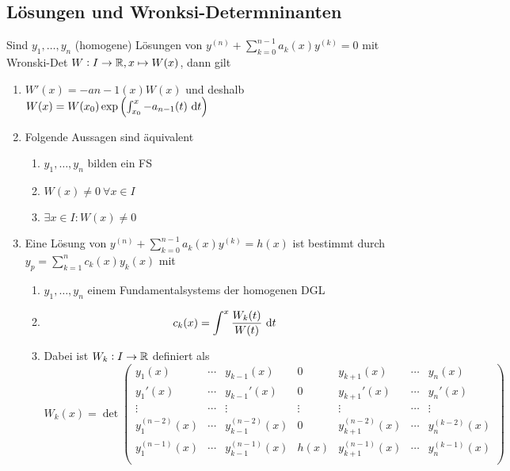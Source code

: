 \subsection{Lösungen und Wronksi-Determninanten}
Sind $y_1, \ldots, y_n$ (homogene) Lösungen von $y^{(n)} + \sum_{k=0}^{n-1} a_k(x) y^{(k)} = 0$ mit Wronski-Det $W: I \to \mathbb{R}, x\mapsto W(x)$,
dann gilt
\begin{enumerate}[label= (\alph*)]
	\item $W'(x) = -a{n-1}(x) W(x)$ und deshalb
		$W(x) = W(x_0) \exp \left( \int_{x_0}^x -a_{n-1}(t) \text{ d}t \right)$
	\item Folgende Aussagen sind äquivalent
		\begin{enumerate}
			\item $y_1, \ldots, y_n$ bilden ein FS
			\item $W(x) \neq 0\ \forall x \in I$
			\item $\exists x  \in I: W(x)  \neq 0$ 
		\end{enumerate}
	\item Eine Lösung von $y^{(n)} + \sum_{k=0}^{n-1} a_k(x) y^{(k)} = h(x)$ ist bestimmt durch
		$y_p = \sum_{k=1}^n c_k(x) y_k(x)$ mit
		\begin{enumerate}
			\item $y_1, \ldots, y_n$ einem Fundamentalsystems der homogenen DGL
			\item
				\begin{equation*}
					c_k(x) = \int^x  \frac{W_k(t)}{W(t)} \text{ d}t
				\end{equation*} 
			\item Dabei ist $W_k: I \to \mathbb{R}$ definiert als
				\begin{equation*}
					W_k(x) = \det \begin{pmatrix}
						y_1(x) & \cdots & y_{k-1}(x) & 0 & y_{k+1}(x) & \cdots & y_n(x) \\
						y_1'(x) & \cdots & y_{k-1}'(x) & 0 & y_{k+1}'(x) & \cdots & y_n'(x) \\
						\vdots & \cdots & \vdots & \vdots & \vdots & \cdots & \vdots \\
						y_1^{(n-2)}(x) & \cdots & y_{k-1}^{(n-2)}(x) & 0 & y_{k+1}^{(n-2)}(x) & \cdots & y_n^{(k-2)}(x)\\  
						y_1^{(n-1)}(x) & \cdots & y_{k-1}^{(n-1)}(x) & h(x) & y_{k+1}^{(n-1)}(x) & \cdots & y_n^{(k-1)}(x)\\  
					\end{pmatrix}
				\end{equation*}
		\end{enumerate}
\end{enumerate}

